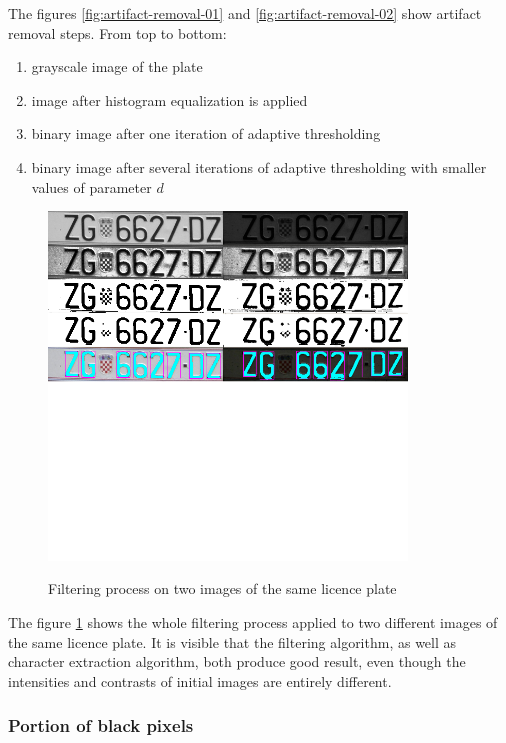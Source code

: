 \documentclass[times, utf8, zavrsni]{fer}
\begin{document}
The figures \ref{fig:artifact-removal-01} and \ref{fig:artifact-removal-02} show
artifact removal steps. From top to bottom:
\begin{enumerate}
  \item grayscale image of the plate
  \item image after histogram equalization is applied
  \item binary image after one iteration of adaptive thresholding
  \item binary image after several iterations of adaptive thresholding
  with smaller values of parameter $d$
\end{enumerate}

\begin{figure}[htb]
\caption{Filtering process on two images of the same licence plate}
\centering
\includegraphics[width=0.85\textwidth]{images/filter-all-scaled}
\label{fig:plate-filter-all}
\end{figure}

The figure \ref{fig:plate-filter-all} shows the whole filtering process applied
to two different images of the same licence plate. It is visible that the
filtering algorithm, as well as character extraction algorithm, both produce
good result, even though the intensities and contrasts of initial images are
entirely different.

\subsubsection{Portion of black pixels}
\end{document}
